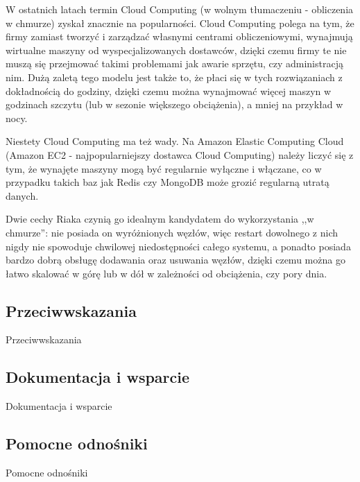 W ostatnich latach termin Cloud Computing (w wolnym tłumaczeniu - obliczenia w chmurze) zyskał znacznie na popularności.
Cloud Computing polega na tym, że firmy zamiast tworzyć i zarządzać własnymi centrami obliczeniowymi, wynajmują wirtualne maszyny od wyspecjalizowanych dostawców, dzięki czemu firmy te nie muszą się przejmować takimi problemami jak awarie sprzętu, czy administracją nim.
Dużą zaletą tego modelu jest także to, że płaci się w tych rozwiązaniach z dokładnością do godziny, dzięki czemu można wynajmować więcej maszyn w godzinach szczytu (lub w sezonie większego obciążenia), a mniej na przykład w nocy.

Niestety Cloud Computing ma też wady.
Na Amazon Elastic Computing Cloud (Amazon EC2 - najpopularniejszy dostawca Cloud Computing) należy liczyć się z tym, że wynajęte maszyny mogą być regularnie wyłączne i włączane, co w przypadku takich baz jak Redis czy MongoDB może grozić regularną utratą danych.

Dwie cechy Riaka czynią go idealnym kandydatem do wykorzystania ,,w chmurze'': nie posiada on wyróżnionych węzłów, więc restart dowolnego z nich nigdy nie spowoduje chwilowej niedostępności całego systemu, a ponadto posiada bardzo dobrą obsługę dodawania oraz usuwania węzłów, dzięki czemu można go łatwo skalować w górę lub w dół w zależności od obciążenia, czy pory dnia.

\subsection*{Przeciwwskazania}

Przeciwwskazania

\subsection*{Dokumentacja i wsparcie}

Dokumentacja i wsparcie

\subsection*{Pomocne odnośniki}
 
Pomocne odnośniki